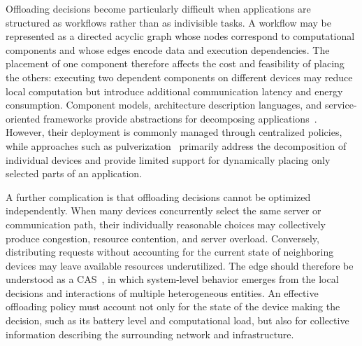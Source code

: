 Offloading decisions become particularly difficult when applications 
 are structured as workflows rather than as indivisible tasks.
%
A workflow may be represented as a directed acyclic graph whose nodes correspond 
 to computational components and whose edges encode data and execution dependencies.
%
The placement of one component therefore affects the cost and feasibility of placing the others:
 executing two dependent components on different devices may reduce local computation 
 but introduce additional communication latency and energy consumption.
%
Component models, architecture description languages, 
 and service-oriented frameworks provide abstractions for decomposing 
 applications~\cite{DBLP:journals/tse/CrnkovicSVC11,DBLP:conf/isola/BallouliBBS18,DBLP:journals/csur/LemosDB16}.
%
However, 
 their deployment is commonly managed through centralized policies, 
  while approaches such as pulverization~\cite{DBLP:journals/fgcs/FarabegoliPCV24} 
  primarily address the decomposition of individual devices and provide limited support 
  for dynamically placing only selected parts of an application.

A further complication is that offloading decisions cannot be optimized independently.
%
When many devices concurrently select the same server or communication path, 
 their individually reasonable choices may collectively produce congestion, 
 resource contention, and server overload.
%
Conversely, 
 distributing requests without accounting for the current state of neighboring devices 
 may leave available resources underutilized.
%
The edge should therefore be understood as a \gls{CAS}~\cite{DBLP:conf/huc/Ferscha15}, 
 in which system-level behavior emerges from the local decisions
 and interactions of multiple heterogeneous entities.
%
An effective offloading policy must account not only for the state of the device making the decision, 
 such as its battery level and computational load, 
 but also for collective information describing the surrounding network and infrastructure.

